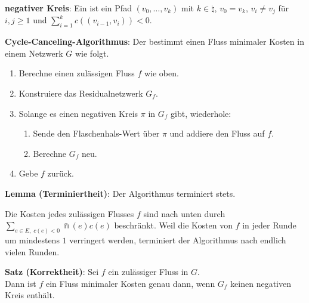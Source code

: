 \textbf{negativer Kreis}:
Ein  ist ein Pfad $(v_0, \dotsc, v_k)$ mit
$k \in \natural$,
$v_0 = v_k$, $v_i \not= v_j$ für $i, j \ge 1$ und $\sum_{i=1}^k c((v_{i-1}, v_i)) < 0$.


\textbf{Cycle-Canceling-Algorithmus}:
Der 
bestimmt einen Fluss minimaler Kosten in einem Netzwerk $G$ wie folgt.
\begin{enumerate}
    \item
    Berechne einen zulässigen Fluss $f$ wie oben.

    \item
    Konstruiere das Residualnetzwerk $G_f$.

    \item
    Solange es einen negativen Kreis $\pi$ in $G_f$ gibt, wiederhole:
    \begin{enumerate}
        \item
        Sende den Flaschenhals-Wert über $\pi$ und addiere den Fluss auf $f$.

        \item
        Berechne $G_f$ neu.
    \end{enumerate}

    \item
    Gebe $f$ zurück.
\end{enumerate}

\linie

\textbf{Lemma (Terminiertheit)}:
Der Algorithmus terminiert stets.

\begin{Beweis}
    Die Kosten jedes zulässigen Flusses $f$ sind nach unten durch
    $\sum_{e \in E,\; c(e) < 0} \Cap(e) c(e)$ beschränkt.
    Weil die Kosten von $f$ in jeder Runde um mindestens $1$ verringert werden,
    terminiert der Algorithmus nach endlich vielen Runden.
\end{Beweis}

\linie

\textbf{Satz (Korrektheit)}:
Sei $f$ ein zulässiger Fluss in $G$.\\
Dann ist $f$ ein Fluss minimaler Kosten genau dann, wenn $G_f$ keinen negativen Kreis enthält.

